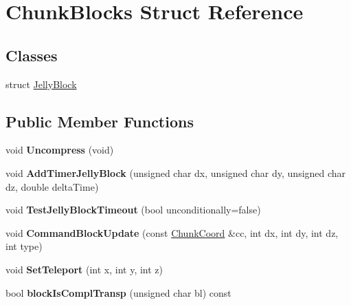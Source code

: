 \hypertarget{structChunkBlocks}{\section{\-Chunk\-Blocks \-Struct \-Reference}
\label{structChunkBlocks}
}
\subsection*{\-Classes}
\begin{DoxyCompactItemize}
\item 
struct \hyperlink{structChunkBlocks_1_1JellyBlock}{\-Jelly\-Block}
\end{DoxyCompactItemize}
\subsection*{\-Public \-Member \-Functions}
\begin{DoxyCompactItemize}
\item 
\hypertarget{structChunkBlocks_aa1c7b35454e63e1fe2e4d36f3bc8b43b}{void {\bfseries \-Uncompress} (void)}\label{structChunkBlocks_aa1c7b35454e63e1fe2e4d36f3bc8b43b}

\item 
\hypertarget{structChunkBlocks_a368d3c0aa49ddbca5f049280f36c1436}{void {\bfseries \-Add\-Timer\-Jelly\-Block} (unsigned char dx, unsigned char dy, unsigned char dz, double delta\-Time)}\label{structChunkBlocks_a368d3c0aa49ddbca5f049280f36c1436}

\item 
\hypertarget{structChunkBlocks_a7a89d2f96506d7239a3f40c43fe5221e}{void {\bfseries \-Test\-Jelly\-Block\-Timeout} (bool unconditionally=false)}\label{structChunkBlocks_a7a89d2f96506d7239a3f40c43fe5221e}

\item 
\hypertarget{structChunkBlocks_af1e1e0891ad48b303439103dd2cec9f4}{void {\bfseries \-Command\-Block\-Update} (const \hyperlink{structChunkCoord}{\-Chunk\-Coord} \&cc, int dx, int dy, int dz, int type)}\label{structChunkBlocks_af1e1e0891ad48b303439103dd2cec9f4}

\item 
\hypertarget{structChunkBlocks_acf35144625684f0cdaef487a4fbab29c}{void {\bfseries \-Set\-Teleport} (int x, int y, int z)}\label{structChunkBlocks_acf35144625684f0cdaef487a4fbab29c}

\item 
\hypertarget{structChunkBlocks_a71df5c97bb349fe1a730592c8aeabb76}{bool {\bfseries block\-Is\-Compl\-Transp} (unsigned char bl) const }\label{structChunkBlocks_a71df5c97bb349fe1a730592c8aeabb76}

\end{DoxyCompactItemize}
